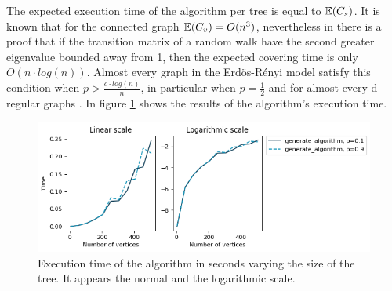 The expected execution time of the algorithm per tree is equal to $\mathbb{E}(C_{s})$. It is known that for the connected graph $\mathbb{E}(C_{v}) = O(n^{3})$, nevertheless in \cite[Broder, Andrei 89]{boundsoncovertime} there is a proof that if the transition matrix of a random walk have the second greater eigenvalue bounded away from 1, then the expected covering time is only $O(n\cdot log(n))$. Almost every graph in the Erdös-Rényi model satisfy this condition when $p > \frac{c\cdot log(n)}{n}$, in particular when $p=\frac{1}{2}$ and for almost every d-regular graphs \cite[Friedman 89]{secondEigenValue}. 
In figure \ref{fig:tiemposGEN} shows the results of the algorithm's execution time.
\begin{figure}[h!]
	\centering
	\includegraphics[scale=0.8]{Python/Figures/Time-execution-generate-algorithm.png}
	\caption{Execution time of the algorithm in seconds varying the size of the tree. It appears the normal and the logarithmic scale.}
	\label{fig:tiemposGEN}
\end{figure}
